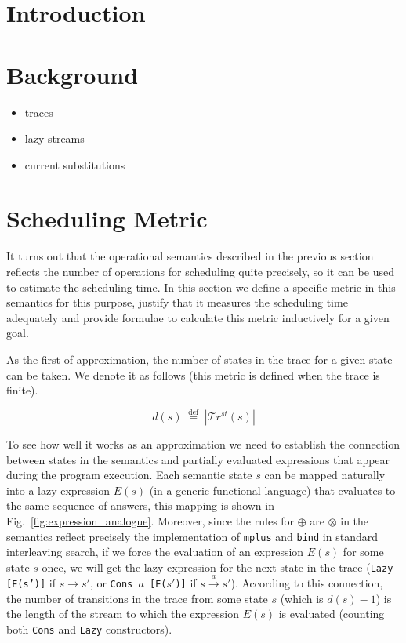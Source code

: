 \documentclass[acmsmall, anonymous, review]{acmart}
\newcommand{\eqdef}{\overset{\mathrm{def}}{=}}
\newcommand{\lazystream}[1]{\texttt{Lazy [{#1}]}}
\newcommand{\consstream}[2]{\texttt{Cons #1 [{#2}]}}
\newcommand{\trs}[1]{\mathcal{T}r^{st}(#1)}
\newcommand{\expranalog}[1]{E(#1)}
\begin{document}
\maketitle

\section{Introduction}

\section{Background}

\begin{itemize}
    \item traces
    \item lazy streams
    \item current substitutions
\end{itemize}

\section{Scheduling Metric}

It turns out that the operational semantics described in the previous section reflects the number of operations for scheduling quite precisely, so it can be used to estimate the scheduling time. In this section we define a specific metric in this semantics for this purpose, justify that it measures the scheduling time adequately and provide formulae to calculate this metric inductively for a given goal.

As the first of approximation, the number of states in the trace for a given state can be taken. We denote it as follows (this metric is defined when the trace is finite).

\[ d(s) \; \eqdef \; | \trs{s} |  \]

To see how well it works as an approximation we need to establish the connection between states in the semantics and partially evaluated expressions that appear during the program execution. Each semantic state $s$ can be mapped naturally into a lazy expression $\expranalog{s}$ (in a generic functional language) that evaluates to the same sequence of answers, this mapping is shown in Fig.~\ref{fig:expression_analogue}. Moreover, since the rules for $\oplus$ are $\otimes$ in the semantics reflect precisely the implementation of \texttt{mplus} and \texttt{bind} in standard interleaving search, if we force the evaluation of an expression $\expranalog{s}$ for some state $s$ once, we will get the lazy expression for the next state in the trace (\lazystream{\expranalog{s'}} if $s \rightarrow s'$, or \consstream{$a$}{\expranalog{$s'$}} if $s \xrightarrow{a} s'$). According to this connection, the number of transitions in the trace from some state $s$ (which is $d(s) - 1$) is the length of the stream to which the expression $\expranalog{s}$ is evaluated (counting both \texttt{Cons} and \texttt{Lazy} constructors).
\end{document}
